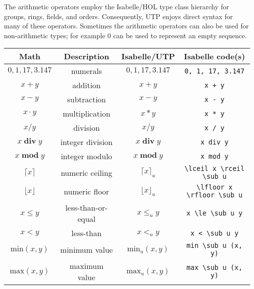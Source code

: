 \documentclass[11pt]{article}
\begin{document}
The arithmetic operators employ the Isabelle/HOL type class hierarchy for groups, rings, fields, and
orders. Consequently, UTP enjoys direct syntax for many of these operators. Sometimes the arithmetic operators can also
be used for non-arithmetic types; for example $0$ can be used to represent an empty sequence.

\begin{center}
\begin{tabular}{|c|c|c|c|} \hline
  \textbf{Math}               & \textbf{Description}        & \textbf{Isabelle/UTP}       & \textbf{Isabelle code(s)} \\ \hline
  $0, 1, 17, 3.147$           & numerals                    & $0, 1, 17, 3.147$           & \verb|0, 1, 17, 3.147| \\
  $x + y$                     & addition                    & $x + y$                     & \verb|x + y| \\
  $x - y$                     & subtraction                 & $x - y$                     & \verb|x - y| \\
  $x \cdot y$                 & multiplication              & $x * y$                     & \verb|x * y| \\  
  $x / y$                     & division                    & $x / y$                     & \verb|x / y| \\
  $x \mathop{\textbf{div}} y$ & integer division            & $x \mathop{\textbf{div}} y$ & \verb|x div y| \\
  $x \mathop{\textbf{mod}} y$ & integer modulo              & $x \mathop{\textbf{mod}} y$ & \verb|x mod y| \\
  $\lceil x \rceil$           & numeric ceiling             & $\lceil x \rceil_u$         & \verb|\lceil x \rceil \sub u| \\
  $\lfloor x \rfloor$         & numeric floor               & $\lfloor x \rfloor_u$       & \verb|\lfloor x \rfloor \sub u| \\
  $x \le y$                   & less-than-or-equal          & $x \le_u y$                 & \verb|x \le \sub u y| \\
  $x < y$                     & less-than                   & $x <_u y$                   & \verb|x < \sub u y| \\
  $\textrm{min}(x, y)$        & minimum value               & $\textrm{min}_u(x, y)$      & \verb|min \sub u (x, y)| \\ 
  $\textrm{max}(x, y)$        & maximum value               & $\textrm{max}_u(x, y)$      & \verb|max \sub u (x, y)| \\ 
  \hline
\end{tabular}
\end{center}
\end{document}
